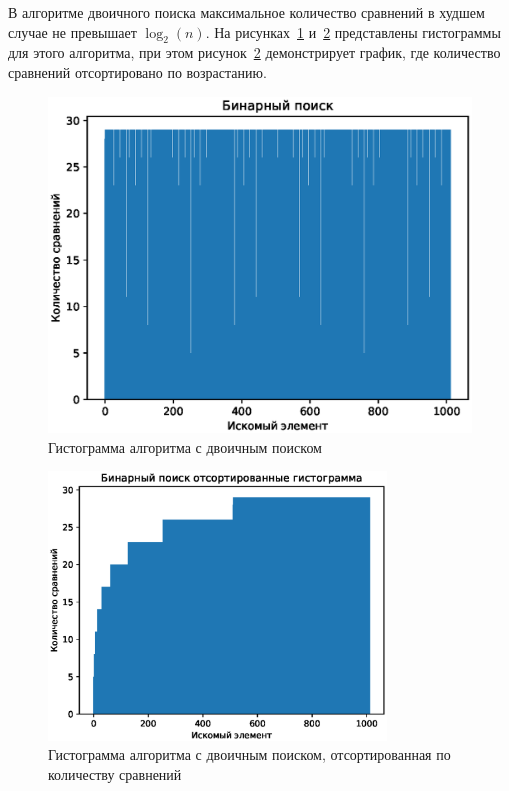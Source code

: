 \clearpage

В алгоритме двоичного поиска максимальное количество сравнений в худшем случае не превышает $\log_2(n)$. На рисунках~\ref{fig:Gist_Binary} и~\ref{fig:Gist_Binary_Sort} представлены гистограммы для этого алгоритма, при этом рисунок~\ref{fig:Gist_Binary_Sort} демонстрирует график, где количество сравнений отсортировано по возрастанию.

\begin{figure}[h]
    \centering
    \includegraphics[scale=1]{img/Figure_2.eps}
    \caption{Гистограмма алгоритма с двоичным поиском}
    \label{fig:Gist_Binary}
\end{figure}

\clearpage
\begin{figure}[h]
    \centering
    \includegraphics[width=0.8\textwidth]{img/Figure_3.eps}
    \caption{Гистограмма алгоритма с двоичным поиском, отсортированная по количеству сравнений}
    \label{fig:Gist_Binary_Sort}
\end{figure}

